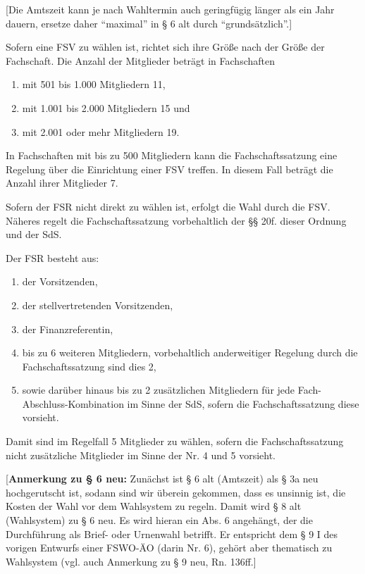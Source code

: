 \documentclass[%
draft,%
multilinesections%
]{fswo}
\newcommand\bemFr[1]{{\color{Red}[#1]}}
\newcommand\bemFr[1]{}%
\begin{document}
\bemFr{Die Amtszeit kann je nach Wahltermin auch geringfügig länger als ein Jahr dauern, ersetze daher \enquote{maximal} in § 6 alt durch \enquote{grundsätzlich}.}

\begin{contract}
Sofern eine FSV zu wählen ist, richtet sich ihre Größe nach der Größe der Fachschaft.
Die Anzahl der Mitglieder beträgt in Fachschaften
\begin{enumerate}
  \item mit 501 bis 1.000 Mitgliedern 11,
  \item mit 1.001 bis 2.000 Mitgliedern 15 und
  \item mit 2.001 oder mehr Mitgliedern 19.
\end{enumerate}

In Fachschaften mit bis zu 500 Mitgliedern kann die Fachschaftssatzung eine Regelung über die Einrichtung einer FSV treffen.
In diesem Fall beträgt die Anzahl ihrer Mitglieder 7.

Sofern der FSR nicht direkt zu wählen ist, erfolgt die Wahl durch die FSV.
Näheres regelt die Fachschaftssatzung vorbehaltlich der §§ 20f. dieser Ordnung und der SdS.

Der FSR besteht aus:
\begin{enumerate}
  \item der Vorsitzenden,
  \item der stellvertretenden Vorsitzenden,
  \item der Finanzreferentin,
  \item bis zu 6 weiteren Mitgliedern, vorbehaltlich anderweitiger Regelung durch die Fachschaftssatzung sind dies 2,
  \item sowie darüber hinaus bis zu 2 zusätzlichen Mitgliedern für jede Fach-Abschluss-Kombination im Sinne der SdS, sofern die Fachschaftssatzung diese vorsieht.
\end{enumerate}
Damit sind im Regelfall 5 Mitglieder zu wählen, sofern die Fachschaftssatzung nicht zusätzliche Mitglieder im Sinne der Nr. 4 und 5 vorsieht.
\end{contract}

\bemFr{\textbf{Anmerkung zu § 6 neu:} Zunächst ist § 6 alt (Amtszeit) als § 3a neu hochgerutscht ist, sodann sind wir überein gekommen, dass es unsinnig ist, die Kosten der Wahl vor dem Wahlsystem zu regeln. Damit wird § 8 alt (Wahlsystem) zu § 6 neu. Es wird hieran ein Abs. 6 angehängt, der die Durchführung als Brief- oder Urnenwahl betrifft. Er entspricht dem § 9 I des vorigen Entwurfs einer FSWO-ÄO (darin Nr. 6), gehört aber thematisch zu Wahlsystem (vgl. auch Anmerkung zu § 9 neu, Rn. 136ff.}
\end{document}
